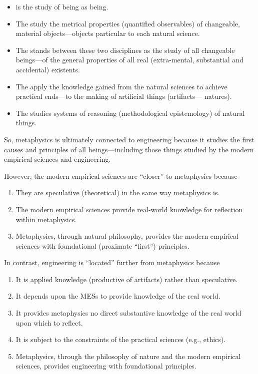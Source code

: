 \begin{itemize}
\item {} is the study of being as being.
\item {} The  study the metrical properties (quantified observables) of changeable, material objects---objects particular to each natural science.
\item {} The  stands between these two disciplines as the study of all changeable beings---of the general properties of all real (extra-mental, substantial and accidental) existents.
\item The  apply the knowledge gained from the natural sciences to achieve practical ends---to the making of artificial things (artifacts--- natures).
\item {} The  studies systems of reasoning (methodological epistemology) of natural things.
\end{itemize}

So, metaphysics is ultimately connected to engineering because it studies the first causes and principles of all beings---including those things studied by the modern empirical sciences and engineering.

However, the modern empirical sciences are ``closer'' to metaphysics because

\begin{enumerate}
\item They are speculative (theoretical) in the same way metaphysics is.
\item The modern empirical sciences provide real-world knowledge for reflection within metaphysics.
\item Metaphysics, through natural philosophy, provides the modern empirical sciences with foundational (proximate ``first'') principles.
\end{enumerate}

In contrast, engineering is ``located'' further from metaphysics because

\begin{enumerate}
\item It is applied knowledge (productive of artifacts) rather than speculative.
\item It depends upon the MESs to provide knowledge of the real world.
\item It provides metaphysics no direct substantive knowledge of the real world upon which to reflect.
\item It is subject to the constraints of the practical sciences (e.g., ethics).
\item Metaphysics, through the philosophy of nature and the modern empirical sciences, provides engineering with foundational principles.
\end{enumerate}

